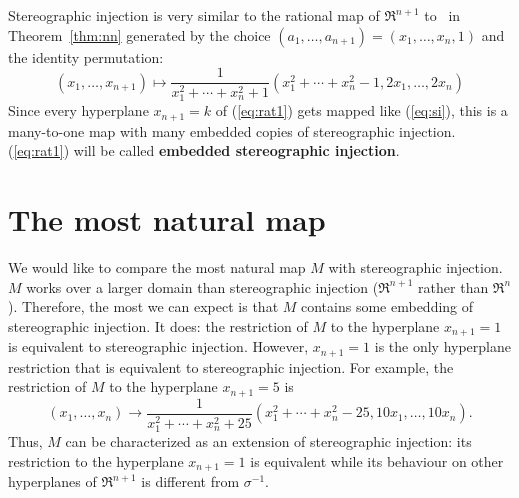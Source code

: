 Stereographic injection is very similar to the rational map of $\Re^{n+1}$ to
\ in Theorem~\ref{thm:nn} generated by the choice 
$(a_1,\ldots,a_{n+1}) = (x_1,\ldots,x_{n},1)$ and the identity permutation:
%
\begin{equation}
\label{eq:rat1}
(x_1,\ldots,x_{n+1}) \mapsto 
	\frac{1}{x_1^2 + \cdots + x_{n}^2 + 1}
	(x_1^2 + \cdots + x_{n}^2 - 1,
	 2x_1, \ldots, 2x_{n})
\end{equation}
%
Since every hyperplane $x_{n+1}=k$ of (\ref{eq:rat1}) gets mapped like 
(\ref{eq:si}), this is a many-to-one map with many embedded copies of
stereographic injection.
(\ref{eq:rat1}) will be called {\bf embedded stereographic injection}.

\section{The most natural map}
\label{sec:M}

We would like to compare the most natural map $M$ with stereographic injection.
$M$ works over a larger domain than stereographic injection ($\Re^{n+1}$
rather than $\Re^n$).
Therefore, the most we can expect is that $M$ contains some embedding of
stereographic injection.
It does: the restriction of $M$ to the hyperplane $x_{n+1}=1$
is equivalent to stereographic injection.
However, $x_{n+1}=1$ is the only hyperplane restriction that is equivalent to 
stereographic injection.
For example, the restriction of $M$ to the hyperplane $x_{n+1}=5$ is
\[
	(x_{1},\ldots,x_n) \rightarrow
	\frac{1}{x_1^2 + \cdots + x_n^2 + 25}
	(x_1^2 + \cdots + x_{n}^2 - 25, 10x_1, \ldots, 10x_n).
\]
Thus, $M$ can be characterized as an extension of stereographic injection:
its restriction to the hyperplane $x_{n+1}=1$ is equivalent
while its behaviour on other hyperplanes of $\Re^{n+1}$ is different
from $\sigma^{-1}$.

